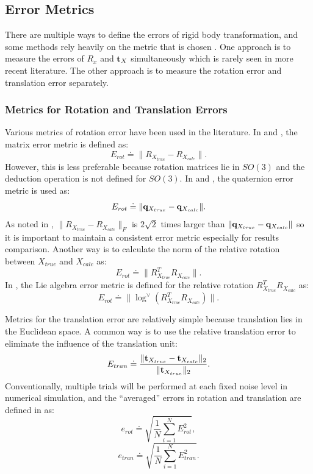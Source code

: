 \documentclass[twocolumn,10pt]{asme2ej}
\newcommand{\ttt}{{\bf t}}
\begin{document}
\subsection{Error Metrics}
There are multiple ways to define the errors of rigid body transformation, and some methods rely heavily on the metric that is chosen \cite{strobl2006optimal}. One approach is to measure the errors of $R_{x}$ and ${\bf t}_{X}$ simultaneously which is rarely seen in more recent literature. The other approach is to measure the rotation error and translation error separately. 
\subsubsection{ Metrics for Rotation and Translation Errors}
Various metrics of rotation error have been used in the literature. In \cite{tsai1989new} and \cite{horaud1995hand}, the matrix error metric is defined as: 
\begin{equation}
E_{rot} \doteq \| R_{X_{true}} - R_{X_{calc}} \|.
\end{equation}
However, this is less preferable because rotation matrices lie in $SO(3)  $ and the deduction operation is not defined for $SO(3)$.
In \cite{daniilidis1999hand} and \cite{andreff1999line}, the quaternion error metric is used as:
\begin{equation}
E_{rot} \doteq \|{\bf q}_{X_{true}} - {\bf q}_{X_{calc}}\|.
\end{equation}
As noted in \cite{daniilidis1996dual}, $\| R_{X_{true}} - R_{X_{calc}}\|_F$ is $2\sqrt{2}$ times larger than $\|{\bf q}_{X_{true}} - {\bf q}_{X_{calc}} \|$ so it is important to maintain a consistent error metric especially for results comparison. 
Another way is to calculate the norm of the relative rotation between $X_{true}$ and $X_{calc}$ as:
\begin{equation}
E_{rot} \doteq \|R^{T}_{X_{true}}R_{X_{calc}}\|.
\end{equation} 
In \cite{ackermanGSI}, the Lie algebra error metric is defined for the relative rotation $R^{T}_{X_{true}}R_{X_{calc}}$ as:
\begin{equation} 
E_{rot} \doteq \|\log^{\vee}(R_{X_{true}}^TR_{X_{calc}})\|.
\label{RotError}
\end{equation}


Metrics for the translation error are relatively simple because translation lies in the Euclidean space. A common way is to use the relative translation error to eliminate the influence of the translation unit:
\begin{equation}
E_{tran} \doteq \dfrac{\|\ttt_{X_{true}}-\ttt_{X_{calc}}\|_{2}}{\|\ttt_{X_{true}}\|_{2}}.
\label{TranError}
\end{equation}
Conventionally, multiple trials will be performed at each fixed noise level in numerical simulation, and the ``averaged'' errors in rotation and translation are defined in \cite{horaud1995hand} as:
\begin{equation}
e_{rot} \doteq \sqrt{\dfrac{1}{N}\sum_{i=1}^{N} E_{rot}^2},
\end{equation}
\begin{equation}
e_{tran} \doteq \sqrt{\dfrac{1}{N}\sum_{i=1}^{N} E_{tran}^2}.
\end{equation}
\end{document}
